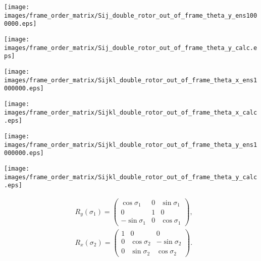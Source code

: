 \documentclass[a4paper,11pt,twoside,openright]{book}
\def\lthtmlcheckvsize{\ifdim\ht\sizebox<\vsize 
  \ifdim\wd\sizebox<\hsize\expandafter\hfill\fi \expandafter\vfill
  \else\expandafter\vss\fi}%
\begin{document}
{\newpage\clearpage
{}%
\texttt{[image: images/frame\_order\_matrix/Sij\_double\_rotor\_out\_of\_frame\_theta\_y\_ens1000000.eps]}%
\lthtmlpictureZ
\lthtmlcheckvsize\clearpage}

{\newpage\clearpage
{}%
\texttt{[image: images/frame\_order\_matrix/Sij\_double\_rotor\_out\_of\_frame\_theta\_y\_calc.eps]}%
\lthtmlpictureZ
\lthtmlcheckvsize\clearpage}

{\newpage\clearpage
{}%
\texttt{[image: images/frame\_order\_matrix/Sijkl\_double\_rotor\_out\_of\_frame\_theta\_x\_ens1000000.eps]}%
\lthtmlpictureZ
\lthtmlcheckvsize\clearpage}

{\newpage\clearpage
{}%
\texttt{[image: images/frame\_order\_matrix/Sijkl\_double\_rotor\_out\_of\_frame\_theta\_x\_calc.eps]}%
\lthtmlpictureZ
\lthtmlcheckvsize\clearpage}

{\newpage\clearpage
{}%
\texttt{[image: images/frame\_order\_matrix/Sijkl\_double\_rotor\_out\_of\_frame\_theta\_y\_ens1000000.eps]}%
\lthtmlpictureZ
\lthtmlcheckvsize\clearpage}

{\newpage\clearpage
{}%
\texttt{[image: images/frame\_order\_matrix/Sijkl\_double\_rotor\_out\_of\_frame\_theta\_y\_calc.eps]}%
\lthtmlpictureZ
\lthtmlcheckvsize\clearpage}

{\newpage\clearpage
\setcounter{equation}{65}
%
\begin{subequations}\begin{align}
&R_y(\sigma_1) =
\begin{pmatrix}
\cos\sigma_1 & 0 & \sin\sigma_1 \\
0 &            1 & 0 \\
-\sin\sigma_1 & 0 & \cos\sigma_1
\end{pmatrix}, \\
&R_x(\sigma_2) =
\begin{pmatrix}
1 & 0            &  0 \\
0 & \cos\sigma_2 & -\sin\sigma_2 \\
0 & \sin\sigma_2 &  \cos\sigma_2
\end{pmatrix}.
\end{align}\end{subequations}%
\lthtmldisplayZ
\lthtmlcheckvsize\clearpage}
\end{document}
